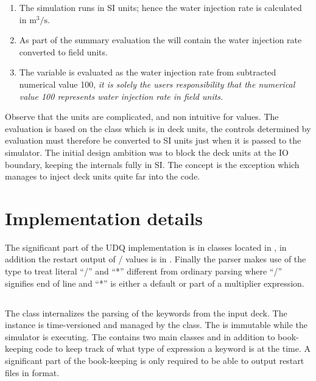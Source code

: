 \begin{enumerate}
\item The simulation runs in SI units; hence the water injection rate is
  calculated in $\mathrm{m^3/s}$.
\item As part of the summary evaluation the  will
  contain the water injection rate converted to field units.
\item The \udq{} variable  is evaluated as the water injection rate from
   subtracted numerical value 100, \emph{it is solely the users 
  responsibility that the numerical value 100 represents water injection rate in
  field units.}
\end{enumerate}

Observe that the units are complicated, and non intuitive for  values.
The  evaluation is based on the  class which is
in deck units, the controls determined by  evaluation must therefore be
converted to SI units just when it is passed to the simulator. The initial
design ambition was to block the deck units at the IO boundary, keeping the
internals fully in SI. The  concept is the exception which manages to
inject deck units quite far into the code.


\section{Implementation details}
The significant part of the UDQ implementation is in classes located in
, in addition the restart output of
\udq{}/ values is in .
Finally the \udq{} parser makes use of the type  to treat
literal ``/'' and ``*'' different from ordinary parsing where ``/'' signifies
end of line and ``*'' is either a default or part of a multiplier expression.

\subsection*{}
The class  internalizes the parsing of the \udq{} keywords
from the input deck. The  instance is time-versioned and
managed by the  class. The  is
immutable while the simulator is executing. The  contains
two main classes  and  in addition
to book-keeping code to keep track of what type of expression a \udq{} keyword
is at the time. A significant part of the book-keeping is only required to be
able to output restart files in \eclipse{} format.

